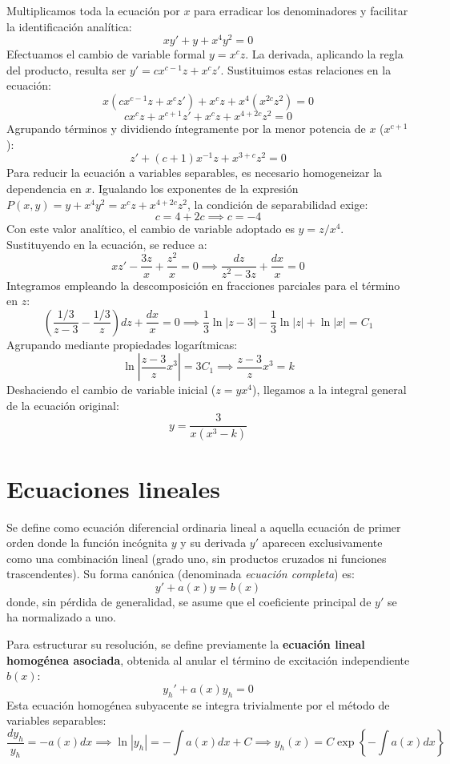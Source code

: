 \begin{tcolorbox}
Multiplicamos toda la ecuación por $x$ para erradicar los denominadores y facilitar la identificación analítica:
$$ xy' + y + x^4y^2 = 0 $$
Efectuamos el cambio de variable formal $y = x^c z$. La derivada, aplicando la regla del producto, resulta ser $y' = c x^{c-1} z + x^c z'$. Sustituimos estas relaciones en la ecuación:
$$ x(c x^{c-1} z + x^c z') + x^c z + x^4 (x^{2c} z^2) = 0 $$
$$ c x^c z + x^{c+1} z' + x^c z + x^{4+2c} z^2 = 0 $$
Agrupando términos y dividiendo íntegramente por la menor potencia de $x$ ($x^{c+1}$):
$$ z' + (c+1)x^{-1}z + x^{3+c}z^2 = 0 $$
Para reducir la ecuación a variables separables, es necesario homogeneizar la dependencia en $x$. Igualando los exponentes de la expresión $P(x,y) = y + x^4y^2 = x^cz + x^{4+2c}z^2$, la condición de separabilidad exige:
$$ c = 4 + 2c \implies c = -4 $$
Con este valor analítico, el cambio de variable adoptado es $y = z/x^4$. Sustituyendo en la ecuación, se reduce a:
$$ xz' - \frac{3z}{x} + \frac{z^2}{x} = 0 \implies \frac{dz}{z^2 - 3z} + \frac{dx}{x} = 0 $$
Integramos empleando la descomposición en fracciones parciales para el término en $z$:
$$ \left( \frac{1/3}{z-3} - \frac{1/3}{z} \right)dz + \frac{dx}{x} = 0 \implies \frac{1}{3}\ln|z-3| - \frac{1}{3}\ln|z| + \ln|x| = C_1 $$
Agrupando mediante propiedades logarítmicas:
$$ \ln\left| \frac{z-3}{z} x^3 \right| = 3C_1 \implies \frac{z-3}{z} x^3 = k $$
Deshaciendo el cambio de variable inicial ($z = yx^4$), llegamos a la integral general de la ecuación original:
$$ y = \frac{3}{x(x^3 - k)} $$
\end{tcolorbox}
\newpage

\section{Ecuaciones lineales}

\begin{definicion}
Se define como ecuación diferencial ordinaria lineal a aquella ecuación de primer orden donde la función incógnita $y$ y su derivada $y'$ aparecen exclusivamente como una combinación lineal (grado uno, sin productos cruzados ni funciones trascendentes). Su forma canónica (denominada \textit{ecuación completa}) es:
$$ y' + a(x)y = b(x) $$
donde, sin pérdida de generalidad, se asume que el coeficiente principal de $y'$ se ha normalizado a uno.
\end{definicion}

Para estructurar su resolución, se define previamente la \textbf{ecuación lineal homogénea asociada}, obtenida al anular el término de excitación independiente $b(x)$:
$$ y_h' + a(x)y_h = 0 $$
Esta ecuación homogénea subyacente se integra trivialmente por el método de variables separables:
$$ \frac{dy_h}{y_h} = -a(x)dx \implies \ln|y_h| = -\int a(x)dx + C \implies y_h(x) = C \exp\left\{ -\int a(x)dx \right\} $$


